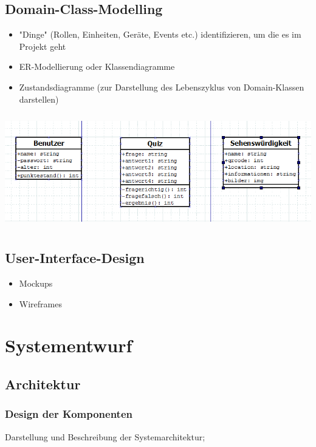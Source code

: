 \section{Domain-Class-Modelling}
\begin{itemize}
	\item "Dinge" (Rollen, Einheiten, Geräte, Events etc.) identifizieren, um die es im Projekt geht
	\item ER-Modellierung oder Klassendiagramme
	\item Zustandsdiagramme (zur Darstellung des Lebenszyklus von Domain-Klassen darstellen)
\end{itemize}

\includegraphics[height=5cm]{domainclass}

\section{User-Interface-Design}
\begin{itemize}
	\item Mockups
	\item Wireframes
\end{itemize}


\chapter{Systementwurf}

\section{Architektur}

\subsection{Design der Komponenten}

Darstellung und Beschreibung der Systemarchitektur;

